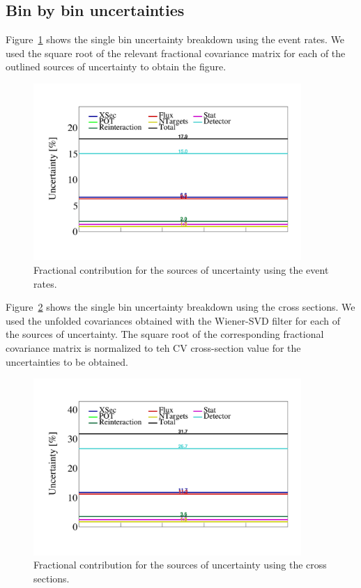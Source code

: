\documentclass{article}
\begin{document}
\clearpage 

\subsection{Bin by bin uncertainties}

Figure~\ref{fig:single-bin-uncertainties-event-rates} shows the single bin uncertainty breakdown 
using the event rates. We used the square root of the relevant fractional covariance matrix for 
each of the outlined sources of uncertainty to obtain the figure.

\begin{figure}[H]
    \centering 
    \includegraphics[width=4in]{../Figs/CAFAna/BinUncertainties/EventCount.png}
    \caption{Fractional contribution for the sources of uncertainty using the event rates.}
    \label{fig:single-bin-uncertainties-event-rates}
\end{figure}

Figure~\ref{fig:single-bin-uncertainties-cross-sections} shows the single bin uncertainty breakdown 
using the cross sections. We used the unfolded covariances obtained with the Wiener-SVD filter 
for each of the sources of uncertainty. The square root of the corresponding fractional covariance 
matrix is normalized to teh CV cross-section value for the uncertainties to be obtained.

\begin{figure}[H]
    \centering 
    \includegraphics[width=4in]{../Figs/CAFAna/UnfBinUncertainties/EventCount.png}
    \caption{Fractional contribution for the sources of uncertainty using the cross sections.}
    \label{fig:single-bin-uncertainties-cross-sections}
\end{figure}
\end{document}
